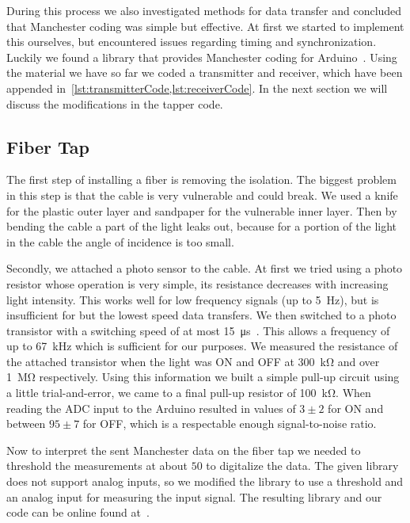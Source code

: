 \documentclass[11pt,twoside,a4paper]{scrartcl}
\begin{document}
		During this process we also investigated methods for data transfer and concluded that Manchester coding was simple but effective.
		At first we started to implement this ourselves, but encountered issues regarding timing and synchronization.
		Luckily we found a library that provides Manchester coding for Arduino~\cite{manchestercoding}.
		Using the material we have so far we coded a transmitter and receiver, which have been appended in~\cref{lst:transmitterCode,lst:receiverCode}.
		In the next section we will discuss the modifications in the tapper code.

	\subsection{Fiber Tap}
		The first step of installing a fiber is removing the isolation.
		The biggest problem in this step is that the cable is very vulnerable and could break.
		We used a knife for the plastic outer layer and sandpaper for the vulnerable inner layer.
		Then by bending the cable a part of the light leaks out,
		because for a portion of the light in the cable the angle of incidence is too small.

		Secondly, we attached a photo sensor to the cable.
		At first we tried using a photo resistor whose operation is very simple,
		its resistance decreases with increasing light intensity.
		This works well for low frequency signals (up to \SI{5}{\hertz}),
		but is insufficient for but the lowest speed data transfers.
		We then switched to a photo transistor with a switching speed of at most \SI{15}{\micro\second}~\cite{phototransistor}.
		This allows a frequency of up to \SI{67}{\kilo\hertz} which is sufficient for our purposes.
		We measured the resistance of the attached transistor when the light was ON and OFF
		at \SI{300}{\kilo\ohm} and over \SI{1}{\mega\ohm} respectively.
		Using this information we built a simple pull-up circuit using a little trial-and-error,
		we came to a final pull-up resistor of \SI{100}{\kilo\ohm}.
		When reading the ADC input to the Arduino resulted in values of $3 \pm 2$ for ON and between $95 \pm 7$ for OFF,
		which is a respectable enough signal-to-noise ratio.

		Now to interpret the sent Manchester data on the fiber tap we needed to threshold the measurements
		at about $50$ to digitalize the data.
		The given library does not support analog inputs, so we modified the library to use
		a threshold and an analog input for measuring the input signal.
		The resulting library and our code can be online found at~\cite{analogmanchestercoding}.
\end{document}
